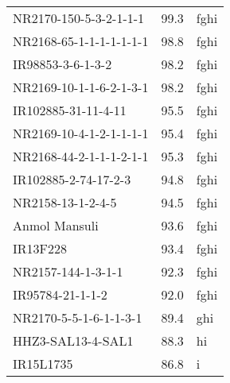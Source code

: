 \documentclass[]{article}
\begin{document}
\begin{longtable}{lll}
NR2170-150-5-3-2-1-1-1 & 99.3 & fghi\\
\rowcolor{gray!6}  NR2168-65-1-1-1-1-1-1-1 & 98.8 & fghi\\
IR98853-3-6-1-3-2 & 98.2 & fghi\\
\addlinespace
\rowcolor{gray!6}  NR2169-10-1-1-6-2-1-3-1 & 98.2 & fghi\\
IR102885-31-11-4-11 & 95.5 & fghi\\
\rowcolor{gray!6}  NR2169-10-4-1-2-1-1-1-1 & 95.4 & fghi\\
NR2168-44-2-1-1-1-2-1-1 & 95.3 & fghi\\
\rowcolor{gray!6}  IR102885-2-74-17-2-3 & 94.8 & fghi\\
\addlinespace
NR2158-13-1-2-4-5 & 94.5 & fghi\\
\rowcolor{gray!6}  Anmol Mansuli & 93.6 & fghi\\
IR13F228 & 93.4 & fghi\\
\rowcolor{gray!6}  NR2157-144-1-3-1-1 & 92.3 & fghi\\
IR95784-21-1-1-2 & 92.0 & fghi\\
\addlinespace
\rowcolor{gray!6}  NR2170-5-5-1-6-1-1-3-1 & 89.4 & ghi\\
HHZ3-SAL13-4-SAL1 & 88.3 & hi\\
\rowcolor{gray!6}  IR15L1735 & 86.8 & i\\
\bottomrule
\end{longtable}
\endgroup{}
\begingroup\fontsize{12}{14}\selectfont
\end{document}
